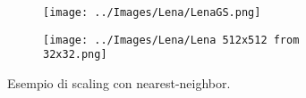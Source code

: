 \documentclass{subfiles}
\begin{document}
\begin{figure}[!h]
    \centering
    \begin{subfigure}[b]{0.4\textwidth}
        \centering
        \texttt{[image: ../Images/Lena/LenaGS.png]}
    \end{subfigure}
    \hspace{10pt}
    \begin{subfigure}[b]{0.4\textwidth}
        \centering
        \texttt{[image: ../Images/Lena/Lena 512x512 from 32x32.png]}
    \end{subfigure}
    \caption{Esempio di scaling con nearest-neighbor.}
    \label{fig:9.1}
\end{figure}
\end{document}
